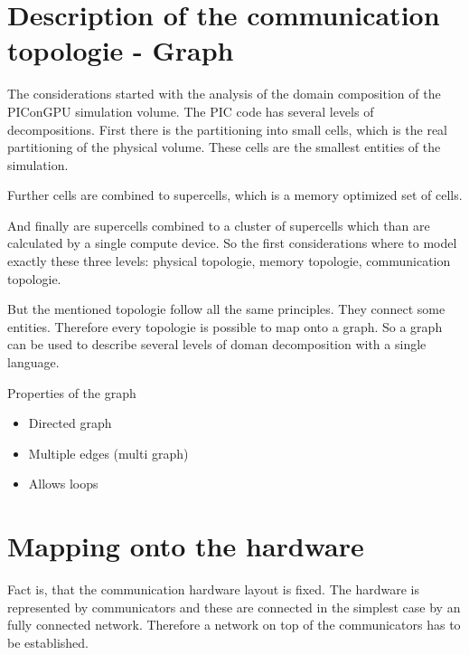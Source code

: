 \section{Description of the communication topologie - Graph}
The considerations started with the analysis of the domain composition
of the PIConGPU simulation volume. The PIC code has several levels of
decompositions. First there is the partitioning into small cells,
which is the real partitioning of the physical volume. These cells are
the smallest entities of the simulation.

Further cells are combined to supercells, which is a memory optimized
set of cells.

And finally are supercells combined to a cluster of supercells which
than are calculated by a single compute device. So the first
considerations where to model exactly these three levels: physical
topologie, memory topologie, communication topologie.

But the mentioned topologie follow all the same principles. They
connect some entities. Therefore every topologie is possible to map
onto a graph.  So a graph can be used to describe several levels of
doman decomposition with a single language.

Properties of the graph
\begin{itemize}
  \item Directed graph
  \item Multiple edges (multi graph)
  \item Allows loops
\end{itemize}

\section{Mapping onto the hardware}

Fact is, that the communication hardware layout is fixed. The hardware
is represented by communicators and these are connected in the
simplest case by an fully connected network. Therefore a network on
top of the communicators has to be established.

